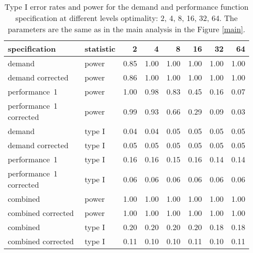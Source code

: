 \begin{table}[ht]
\centering
\begingroup\footnotesize
\begin{tabular}{llrrrrrr}
  \hline
specification & statistic & 2 & 4 & 8 & 16 & 32 & 64 \\ 
  \hline
demand & power & 0.85 & 1.00 & 1.00 & 1.00 & 1.00 & 1.00 \\ 
  demand corrected & power & 0.86 & 1.00 & 1.00 & 1.00 & 1.00 & 1.00 \\ 
  performance~1 & power & 1.00 & 0.98 & 0.83 & 0.45 & 0.16 & 0.07 \\ 
  performance~1 corrected & power & 0.99 & 0.93 & 0.66 & 0.29 & 0.09 & 0.03 \\ 
  demand & type I & 0.04 & 0.04 & 0.05 & 0.05 & 0.05 & 0.05 \\ 
  demand corrected & type I & 0.05 & 0.05 & 0.05 & 0.05 & 0.05 & 0.05 \\ 
  performance~1 & type I & 0.16 & 0.16 & 0.15 & 0.16 & 0.14 & 0.14 \\ 
  performance~1 corrected & type I & 0.06 & 0.06 & 0.06 & 0.06 & 0.06 & 0.06 \\ 
  combined & power & 1.00 & 1.00 & 1.00 & 1.00 & 1.00 & 1.00 \\ 
  combined corrected & power & 1.00 & 1.00 & 1.00 & 1.00 & 1.00 & 1.00 \\ 
  combined & type I & 0.20 & 0.20 & 0.20 & 0.20 & 0.18 & 0.18 \\ 
  combined corrected & type I & 0.11 & 0.10 & 0.10 & 0.11 & 0.10 & 0.11 \\ 
   \hline
\end{tabular}
\endgroup
\caption{Type I error rates and power for the demand and
  performance function specification at different levels optimality:
  2, 4, 8, 16, 32, 64. The parameters are the same as in the main 
  analysis in the Figure \ref{main}.} 
\label{nearly-table}
\end{table}
